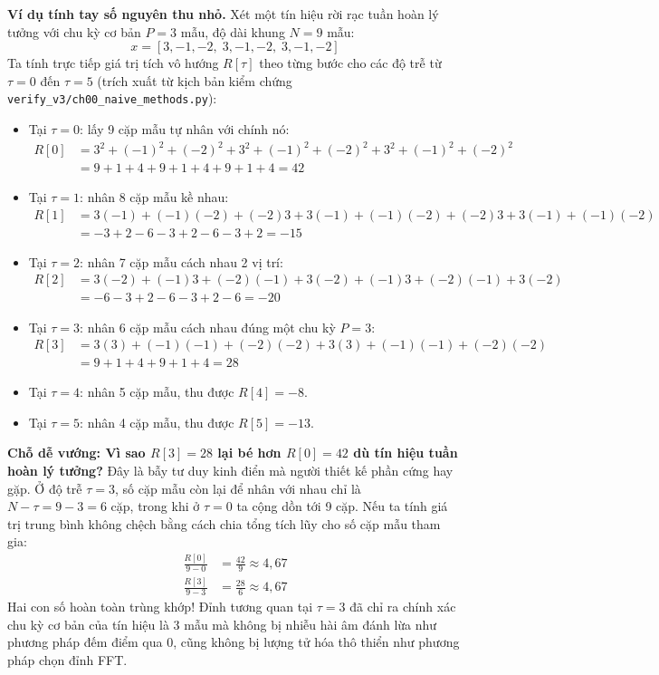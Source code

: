 \textbf{Ví dụ tính tay số nguyên thu nhỏ.} Xét một tín hiệu rời rạc tuần hoàn lý tưởng với chu kỳ cơ bản $P = 3$ mẫu, độ dài khung $N = 9$ mẫu:
\begin{equation}
x = [3, -1, -2, \; 3, -1, -2, \; 3, -1, -2]
\end{equation}
Ta tính trực tiếp giá trị tích vô hướng $R[\tau]$ theo từng bước cho các độ trễ từ $\tau = 0$ đến $\tau = 5$ (trích xuất từ kịch bản kiểm chứng \texttt{verify\_v3/ch00\_naive\_methods.py}):
\begin{itemize}[leftmargin=1.5em, itemsep=2pt]
    \item Tại $\tau = 0$: lấy 9 cặp mẫu tự nhân với chính nó:
    \begin{align*}
    R[0] &= 3^2 + (-1)^2 + (-2)^2 + 3^2 + (-1)^2 + (-2)^2 + 3^2 + (-1)^2 + (-2)^2 \\
         &= 9 + 1 + 4 + 9 + 1 + 4 + 9 + 1 + 4 = 42
    \end{align*}
    \item Tại $\tau = 1$: nhân 8 cặp mẫu kề nhau:
    \begin{align*}
    R[1] &= 3(-1) + (-1)(-2) + (-2)3 + 3(-1) + (-1)(-2) + (-2)3 + 3(-1) + (-1)(-2) \\
         &= -3 + 2 - 6 - 3 + 2 - 6 - 3 + 2 = -15
    \end{align*}
    \item Tại $\tau = 2$: nhân 7 cặp mẫu cách nhau 2 vị trí:
    \begin{align*}
    R[2] &= 3(-2) + (-1)3 + (-2)(-1) + 3(-2) + (-1)3 + (-2)(-1) + 3(-2) \\
         &= -6 - 3 + 2 - 6 - 3 + 2 - 6 = -20
    \end{align*}
    \item Tại $\tau = 3$: nhân 6 cặp mẫu cách nhau đúng một chu kỳ $P=3$:
    \begin{align*}
    R[3] &= 3(3) + (-1)(-1) + (-2)(-2) + 3(3) + (-1)(-1) + (-2)(-2) \\
         &= 9 + 1 + 4 + 9 + 1 + 4 = 28
    \end{align*}
    \item Tại $\tau = 4$: nhân 5 cặp mẫu, thu được $R[4] = -8$.
    \item Tại $\tau = 5$: nhân 4 cặp mẫu, thu được $R[5] = -13$.
\end{itemize}

\textbf{Chỗ dễ vướng: Vì sao $R[3] = 28$ lại bé hơn $R[0] = 42$ dù tín hiệu tuần hoàn lý tưởng?}
Đây là bẫy tư duy kinh điển mà người thiết kế phần cứng hay gặp. Ở độ trễ $\tau = 3$, số cặp mẫu còn lại để nhân với nhau chỉ là $N - \tau = 9 - 3 = 6$ cặp, trong khi ở $\tau = 0$ ta cộng dồn tới 9 cặp. Nếu ta tính giá trị trung bình không chệch bằng cách chia tổng tích lũy cho số cặp mẫu tham gia:
\begin{align}
\frac{R[0]}{9 - 0} &= \frac{42}{9} \approx 4{,}67 \\
\frac{R[3]}{9 - 3} &= \frac{28}{6} \approx 4{,}67
\end{align}
Hai con số hoàn toàn trùng khớp! Đỉnh tương quan tại $\tau = 3$ đã chỉ ra chính xác chu kỳ cơ bản của tín hiệu là 3 mẫu mà không bị nhiễu hài âm đánh lừa như phương pháp đếm điểm qua 0, cũng không bị lượng tử hóa thô thiển như phương pháp chọn đỉnh FFT.

